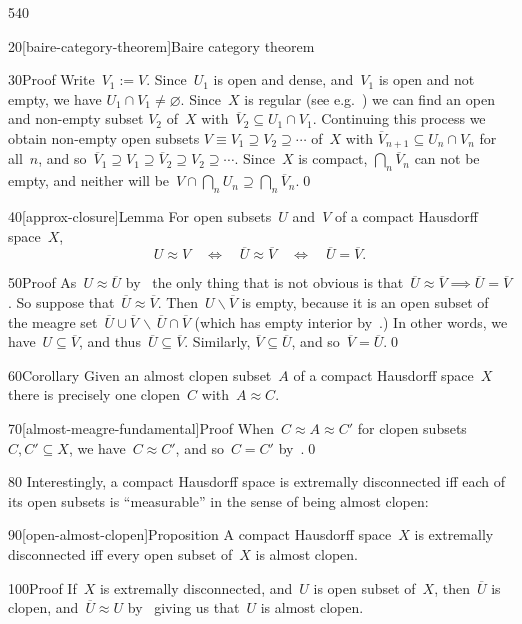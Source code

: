 \begin{parsec}{540}
\begin{point}{20}[baire-category-theorem]{Baire category theorem}
\begin{point}{30}{Proof}
Write~$V_1:=V$.
Since~$U_1$ is open and dense, and~$V_1$ is open and not empty,
we have $U_1\cap V_1\neq \varnothing$.
	Since~$X$ is regular (see e.g.~\cite{willard})
we can find an open and non-empty subset $V_2$ of~$X$
with~$\overline{V}_2\subseteq U_1\cap V_1$.
Continuing this process
we obtain non-empty open subsets $V\equiv V_1 \supseteq V_2\supseteq \dotsb$
	of~$X$ with $\overline{V}_{n+1} \subseteq U_n\cap V_n$
for all~$n$,
and so~$
\overline{V}_1 \supseteq V_1 
\supseteq \overline{V}_2 \supseteq V_2 
\supseteq \dotsb$.
Since~$X$ is compact,
$\bigcap_n \overline{V}_n$
can not be empty,
and neither will be~$V\cap \bigcap_n U_n
\supseteq \bigcap_n \overline{V}_n$.\qed
\end{point}
\end{point}
\begin{point}{40}[approx-closure]{Lemma}%
For open subsets~$U$ and~$V$ of a compact Hausdorff
space~$X$,
\begin{equation*}
U\approx V\quad\iff\quad
\overline{U}\approx \overline{V}
\quad\iff\quad
\overline{U}=\overline{V}.
\end{equation*}
\spacingfix%
\begin{point}{50}{Proof}%
As~$U\approx \overline{U}$ by~
the only thing that is not obvious
is that~$\overline{U}\approx \overline{V} \implies \overline{U}=\overline{V}$.
So suppose that~$\overline{U}\approx \overline{V}$.
Then~$U\backslash \overline{V}$
is empty, because it is an open subset of the
meagre set~$\overline{U}\cup\overline{V}\,\backslash\,
\overline{U}\cap\overline{V}$
(which has empty interior by~.) In other words,
we have~$U\subseteq \overline{V}$, 
and thus~$\overline{U}\subseteq \overline{V}$.
Similarly, $\overline{V}\subseteq\overline{U}$,
and so~$\overline{V}=\overline{U}$.\qed
\end{point}
\end{point}
\begin{point}{60}{Corollary}%
Given an almost clopen subset~$A$ of a compact Hausdorff
space~$X$ there is precisely one clopen~$C$ with~$A\approx C$.
\begin{point}{70}[almost-meagre-fundamental]{Proof}%
When~$C\approx A \approx C'$
for clopen subsets~$C,C'\subseteq X$,
we have~$C\approx C'$,
and so~$C=C'$ by~.\qed
\end{point}
\end{point}
\begin{point}{80}%
Interestingly,
a compact Hausdorff space is extremally disconnected
iff each of its open subsets is ``measurable''
in the sense of being almost clopen:
\end{point}
\begin{point}{90}[open-almost-clopen]{Proposition}%
A compact Hausdorff space~$X$
is extremally disconnected
iff every open subset of~$X$
is almost clopen.
\begin{point}{100}{Proof}%
If~$X$ is extremally disconnected,
and~$U$ is open subset of~$X$,
then~$\overline{U}$ is clopen,
and~$\overline{U}\approx U$ by~
giving us that~$U$ is almost clopen.


\end{point}
\end{point}
\end{parsec}
